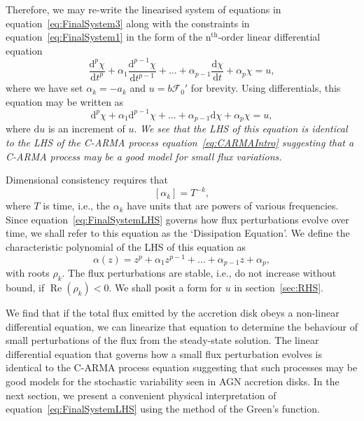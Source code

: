 \documentclass[a4paper,fleqn,usenatbib]{mnras}
\begin{document}
Therefore, we may re-write the linearised system of equations in equation~\eqref{eq:FinalSystem3} along with the constraints in equation~\eqref{eq:FinalSystem1} in the form of the n$^{\mathrm{th}}$-order linear differential equation
\begin{equation}\label{eq:FinalSystemLHS}
\frac{\mathrm{d}^{p}\chi}{\mathrm{d}t^{p}} + \alpha_{1} \frac{\mathrm{d}^{p-1}\chi}{\mathrm{d}t^{p-1}} + \ldots + \alpha_{p-1} \frac{\mathrm{d}\chi}{\mathrm{d}t} + \alpha_{p} \chi = u,
\end{equation}
where we have set $\alpha_{k} = -a_{k}$ and $u = b\mathcal{F}_{0}'$ for brevity. Using differentials, this equation may be written as
\begin{equation}\label{eq:FinalSystemLHSDiff}
\mathrm{d}^{p}\chi + \alpha_{1} \mathrm{d}^{p-1}\chi + \ldots + \alpha_{p-1} \mathrm{d}\chi + \alpha_{p} \chi = u,
\end{equation}
where $\mathrm{d}u$ is an increment of $u$. \textit{We see that the LHS of this equation is identical to the LHS of the C-ARMA process equation~\eqref{eq:CARMAIntro} suggesting that a C-ARMA process may be a good model for small flux variations.}

Dimensional consistency requires that
\begin{equation}\label{eq:ARUnits}
[\alpha_{k}] = T^{-k},
\end{equation}
where $T$ is time, i.e., the $\alpha_{k}$ have units that are powers of various frequencies. Since equation~\eqref{eq:FinalSystemLHS} governs how flux perturbations evolve over time, we shall refer to this equation as the `Dissipation Equation'. We define the characteristic polynomial of the LHS of this equation as
\begin{equation}\label{eq:ARCharPoly}
\alpha(z) = z^{p} + \alpha_{1} z^{p-1} + \ldots + \alpha_{p-1}z + \alpha_{p},
\end{equation}
with roots $\rho_{k}$. The flux perturbations are stable, i.e., do not increase without bound, if $\operatorname{Re}(\rho_{k}) < 0$. We shall posit a form for $u$ in section~\ref{sec:RHS}.

We find that if the total flux emitted by the accretion disk obeys a non-linear differential equation, we can linearize that equation to determine the behaviour of small perturbations of the flux from the steady-state solution. The linear differential equation that governs how a small flux perturbation evolves is identical to the C-ARMA process equation suggesting that such processes may be good models for the stochastic variability seen in AGN accretion disks. In the next section, we present a convenient physical interpretation of equation~\eqref{eq:FinalSystemLHS} using the method of the Green's function.
\end{document}
